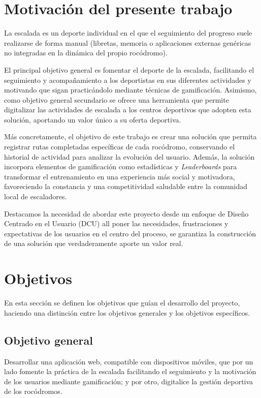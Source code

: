 \section{Motivación del presente trabajo}

La escalada es un deporte individual en el que el seguimiento del progreso suele realizarse de forma manual (libretas, memoria o 
aplicaciones externas genéricas no integradas en la dinámica del propio rocódromo). 

El principal objetivo general es fomentar el deporte de la escalada, facilitando el seguimiento y acompañamiento a los deportistas en sus 
diferentes actividades y motivando que sigan practicándolo mediante técnicas de gamificación. Asimismo, como objetivo general secundario 
se ofrece una herramienta que permite digitalizar las actividades de escalada a los centros deportivos que adopten esta solución, 
aportando un valor único a su oferta deportiva.

Más concretamente, el objetivo de este trabajo es crear una solución que permita registrar rutas completadas específicas de cada rocódromo, 
conservando el historial de actividad para analizar la evolución del usuario. Además, la solución incorpora elementos de gamificación 
como estadísticas y \textit{Leaderboards} para transformar el entrenamiento en una experiencia más social y motivadora, favoreciendo la 
constancia y una competitividad saludable entre la comunidad local de escaladores.

Destacamos la necesidad de abordar este proyecto desde un enfoque de Diseño Centrado en el Usuario (DCU) all poner las necesidades, 
frustraciones y expectativas de los usuarios en el centro del proceso, se garantiza la construcción de una solución que verdaderamente 
aporte un valor real.


\section{Objetivos}

En esta sección se definen los objetivos que guían el desarrollo del proyecto, haciendo una distinción entre los objetivos generales y 
los objetivos específicos.

\subsection{Objetivo general}

Desarrollar una aplicación web, compatible con dispositivos móviles, que por un lado fomente la práctica de la escalada facilitando 
el seguimiento y la motivación de los usuarios mediante gamificación; y por otro, digitalice la gestión deportiva de los rocódromos.

